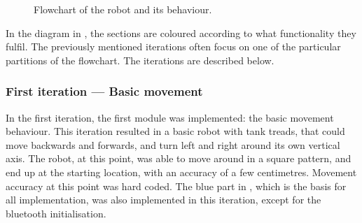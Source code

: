 \begin{figure}[H]
     \center{}
     \caption{\label{fig:CompleteRobotFlowchart} Flowchart of the robot and its behaviour.}
\end{figure}

In the diagram in , the sections are coloured according to what functionality they fulfil. The previously mentioned iterations often focus on one of the particular partitions of the flowchart. The iterations are described below.


\subsubsection{First iteration --- Basic movement}
In the first iteration, the first module was implemented: the basic movement behaviour. This iteration resulted in a basic robot with tank treads, that could move backwards and forwards, and turn left and right around its own vertical axis. The robot, at this point, was able to move around in a square pattern, and end up at the starting location, with an accuracy of a few centimetres. Movement accuracy at this point was hard coded. The blue part in , which is the basis for all implementation, was also implemented in this iteration, except for the bluetooth initialisation.


